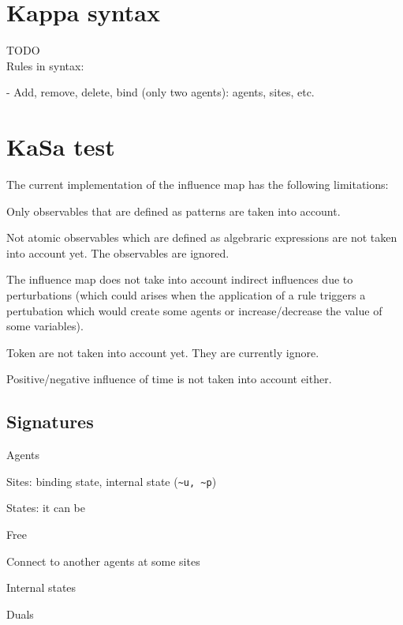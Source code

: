 \documentclass{article}
\begin{document}
\section{Kappa syntax}

TODO\\

Rules in \kapa syntax:

- Add, remove, delete, bind (only two agents): agents, sites, etc.



\section{KaSa test}

The current implementation of the influence map has the following
limitations:
\begin{i}
\item Only observables that are defined as patterns are taken into account.
\item Not atomic observables which are defined as algebraric expressions
  are not taken into account yet. The observables are ignored.
\item The influence map does not take into account indirect influences due
  to perturbations (which could arises when the application of a rule
  triggers a pertubation which would create some agents or
  increase/decrease the value of some variables).
\item Token are not taken into account yet. They are currently ignore.
\item Positive/negative influence of time is not taken into account either.
\end{i}


\subsection{Signatures}

\begin{i}
\item Agents
\item Sites: binding state, internal state (\verb|~u, ~p|)
\item States: it can be
\begin{i}
\item Free
\item Connect to another agents at some sites
\item Internal states
\end{i}
\item Duals
\end{i}
\end{document}
